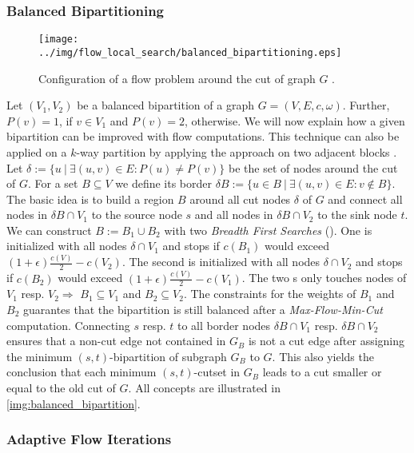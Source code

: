 \subsubsection{Balanced Bipartitioning}
\label{sec:balanced_bipartitioning}
\begin{figure}
\centering
\texttt{[image: ../img/flow\_local\_search/balanced\_bipartitioning.eps]}
\caption{Configuration of a flow problem around the cut of graph $G$ \cite{sanders2011engineering}.}
\label{img:balanced_bipartition}
\end{figure}
Let $(V_1,V_2)$ be a balanced bipartition of a graph $G = (V,E,c,\omega)$. 
Further, $P(v) = 1$, if $v \in V_1$ and
$P(v) = 2$, otherwise. We will now explain how a given bipartition 
can be improved with flow computations. This technique can also be applied on a $k$-way 
partition by applying the approach on two adjacent blocks \cite{sanders2011engineering}. \\
Let $\delta := \{ u\ |\ \exists (u,v) \in E: P(u) \neq P(v) \}$ be the set of nodes
around the cut of $G$. For a set $B \subseteq V$ we define its border 
$\delta B := \{u \in B\ |\ \exists (u,v) \in E: v \notin B\}$.
The basic idea is to build a region $B$ around all cut nodes $\delta$ of 
$G$ and connect all nodes in $\delta B \cap V_1$ to the source node $s$ and all nodes in 
$\delta B \cap V_2$ to the sink node $t$. \\
We can construct $B := B_1 \cup B_2$ with two \emph{Breadth First Searches} (\BFS). 
One is initialized with all nodes $\delta \cap V_1$ and stops if $c(B_1)$ would 
exceed $(1+\epsilon)\frac{c(V)}{2} - c(V_2)$. The second is initialized with 
all nodes $\delta \cap V_2$ and stops if $c(B_2)$ would exceed 
$(1+\epsilon)\frac{c(V)}{2} - c(V_1)$. The two \BFS s only touches nodes of $V_1$ resp. $V_2 \Rightarrow$
$B_1 \subseteq V_1$ and $B_2 \subseteq V_2$. The constraints for the weights of $B_1$
and $B_2$ guarantes that the bipartition is still balanced after a \emph{Max-Flow-Min-Cut}
computation. Connecting $s$ resp. $t$ to all border nodes $\delta B \cap V_1$ resp.
$\delta B \cap V_2$ ensures that a non-cut edge not contained in $G_B$ is not a cut edge after
assigning the minimum $(s,t)$-bipartition of subgraph $G_B$ to $G$. This also yields 
the conclusion that each minimum $(s,t)$-cutset in $G_B$ leads to a cut smaller or 
equal to the old cut of $G$. All concepts are illustrated in \autoref{img:balanced_bipartition}.


\subsubsection{Adaptive Flow Iterations}
\label{sec:adaptive_flow_iterations}

